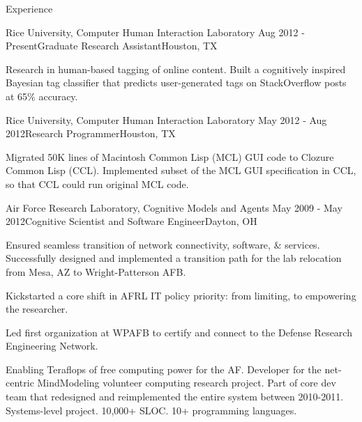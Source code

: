 
\begin{rSection}{Experience}

  \begin{rSubsection}{Rice University, Computer Human Interaction Laboratory}
    {Aug 2012 - Present}{Graduate Research Assistant}{Houston, TX}
  \item Research in human-based tagging of online content.
    Built a cognitively inspired Bayesian tag classifier that predicts user-generated tags on StackOverflow posts at 65\% accuracy.
  \end{rSubsection}

  \begin{rSubsection}{Rice University, Computer Human Interaction Laboratory}
    {May 2012 - Aug 2012}{Research Programmer}{Houston, TX}
  \item Migrated 50K lines of Macintosh Common Lisp (MCL) GUI code to Clozure Common Lisp (CCL).
    Implemented subset of the MCL GUI specification in CCL, so that CCL could run original MCL code.
  \end{rSubsection}

  \begin{rSubsection}{Air Force Research Laboratory, Cognitive Models and Agents}
    {May 2009 - May 2012}{Cognitive Scientist and Software Engineer}{Dayton, OH}
  \item
    Ensured seamless transition of network connectivity, software, \& services.
    Successfully designed and implemented a transition path for the lab relocation from Mesa, AZ to Wright-Patterson AFB. 
  \item 
    Kickstarted a core shift in AFRL IT policy priority: from limiting, to empowering the researcher.
  \item
    Led first organization at WPAFB to certify and connect to the Defense Research Engineering Network.
  \item 
    Enabling Teraflops of free computing power for the AF.
    Developer for the net-centric MindModeling volunteer computing research project.
    Part of core dev team that redesigned and reimplemented the entire system between 2010-2011.
    Systems-level project. 10,000+ SLOC. 10+ programming languages. 
  \end{rSubsection}


\end{rSection}
